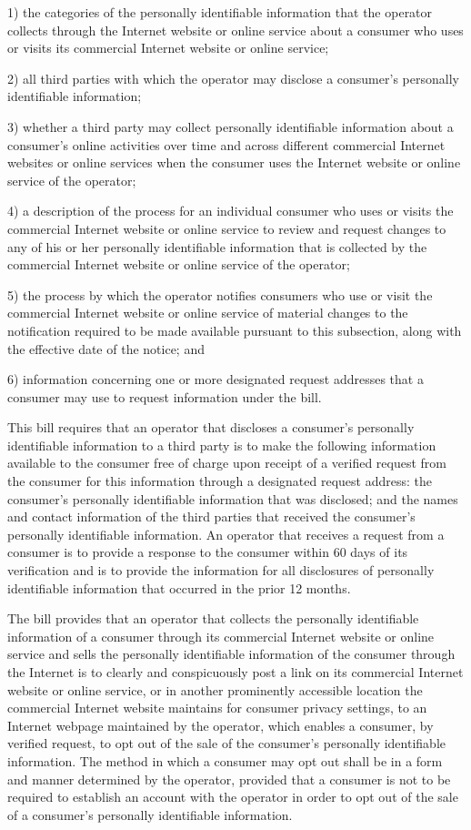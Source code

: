      1)    the categories of the personally identifiable information that the operator collects through the Internet website or online service about a consumer who uses or visits its commercial Internet website or online service;

     2)    all third parties with which the operator may disclose a consumer's personally identifiable information;

     3)    whether a third party may collect personally identifiable information about a consumer's online activities over time and across different commercial Internet websites or online services when the consumer uses the Internet website or online service of the operator;

     4)    a description of the process for an individual consumer who uses or visits the commercial Internet website or online service to review and request changes to any of his or her personally identifiable information that is collected by the commercial Internet website or online service of the operator;

     5)    the process by which the operator notifies consumers who use or visit the commercial Internet website or online service of material changes to the notification required to be made available pursuant to this subsection, along with the effective date of the notice; and

     6)    information concerning one or more designated request addresses that a consumer may use to request information under the bill.

     This bill requires that an operator that discloses a consumer's personally identifiable information to a third party is to make the following information available to the consumer free of charge upon receipt of a verified request from the consumer for this information through a designated request address: the consumer's personally identifiable information that was disclosed; and the names and contact information of the third parties that received the consumer's personally identifiable information. An operator that receives a request from a consumer is to provide a response to the consumer within 60 days of its verification and is to provide the information for all disclosures of personally identifiable information that occurred in the prior 12 months.

     The bill provides that an operator that collects the personally identifiable information of a consumer through its commercial Internet website or online service and sells the personally identifiable information of the consumer through the Internet is to clearly and conspicuously post a link on its commercial Internet website or online service, or in another prominently accessible location the commercial Internet website maintains for consumer privacy settings, to an Internet webpage maintained by the operator, which enables a consumer, by verified request, to opt out of the sale of the consumer's personally identifiable information. The method in which a consumer may opt out shall be in a form and manner determined by the operator, provided that a consumer is not to be required to establish an account with the operator in order to opt out of the sale of a consumer's personally identifiable information.

